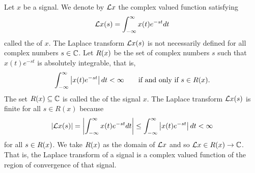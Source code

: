 Let $x$ be a signal.  We denote by $\mathcal L x$ the complex valued function satisfying
\begin{equation}\label{eq:laplace_defn}
\mathcal L x(s) = \int_{-\infty}^{\infty} x(t) e^{-st} dt
\end{equation}
called the  of $x$.  The Laplace transform $\mathcal L x(s)$ is not necessarily defined for all complex numbers $s \in {\mathbb C}$.  
Let $R(x)$ be the set of complex numbers $s$ such that $x(t) e^{-s t}$ is absolutely integrable, that is,
\[
\int_{-\infty}^{\infty} \left\vert x(t) e^{-s t} \right\vert dt < \infty  \qquad \text{if and only if $s \in R(x)$}.
\]
The set $R(x) \subseteq {\mathbb C}$ is called the  of the signal $x$.  The Laplace transform $\mathcal L x(s)$ is finite for all $s \in R(x)$ because 
\[
\vert \mathcal L x(s) \vert = \left\vert \int_{-\infty}^{\infty} x(t) e^{-st} dt \right\vert \leq \int_{-\infty}^{\infty} \left\vert x(t) e^{-s t} \right\vert dt < \infty
\]
for all $s \in R(x)$.  We take $R(x)$ as the domain of $\mathcal L x$ and so $\mathcal L x \in R(x) \to {\mathbb C}$.  That is, the Laplace transform of a signal is a complex valued function of the region of convergence of that signal.


